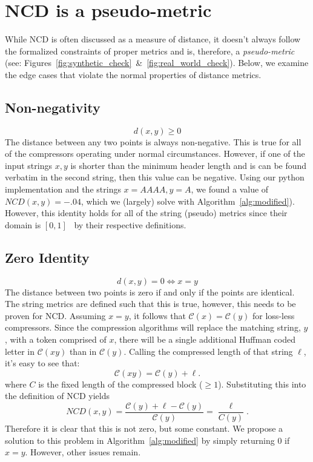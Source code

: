 \documentclass[conference]{IEEEtran}
\begin{document}
\section{NCD is a pseudo-metric}
\label{pseudometric}
While NCD is often discussed as a measure of distance, it doesn't always follow the formalized constraints of proper metrics and is, therefore, a \textit{pseudo-metric} (see: Figures~\ref{fig:synthetic_check}~\&~\ref{fig:real_world_check}). Below, we examine the edge cases that violate the normal properties of distance metrics.

\subsection{Non-negativity} 
$$
d(x, y) \geq 0
$$
The distance between any two points is always non-negative. This is true for all of the compressors operating under normal circumstances. However, if one of the input strings $x,y$ is shorter than the minimum header length and is can be found verbatim in the second string, then this value can be negative. Using our python implementation and the strings $x=AAAA, y=A$, we found a value of $NCD(x,y) = -.04$, which we (largely) solve with Algorithm~\ref{alg:modified}).
However, this identity holds for all of the string (pseudo) metrics since their domain is $[0,1]$~\cite{metrics,levenshtein} by their respective definitions. 


\subsection{Zero Identity} 
$$
d(x, y) = 0 \iff x = y
$$
The distance between two points is zero if and only if the points are identical. The string metrics are defined such that this is true, however, this needs to be proven for NCD.
Assuming $x = y$, it follows that $\mathcal{C}(x) = \mathcal{C}(y)$ for loss-less compressors.
Since the compression algorithms will replace the matching string, $y$, with a token comprised of $x$, there will be a single additional Huffman coded letter in $\mathcal{C}(xy)$ than in $\mathcal{C}(y)$. Calling the compressed length of that  string $\ell$, it's easy to see that:
$$
\mathcal{C}(xy) = \mathcal{C}(y) + \ell.
$$
where $C$ is the fixed length of the compressed block ($\geq 1$).
Substituting this into the definition of NCD yields
$$
NCD(x,y) = \frac{\mathcal{C}(y) + \ell - \mathcal{C}(y)}{\mathcal{C}(y)} = \frac{\ell}{C(y)}.
$$
Therefore it is clear that this is not zero, but some constant. 
We propose a solution to this problem in Algorithm~\ref{alg:modified} by simply returning 0 if $x=y$. However, other issues remain. 
\end{document}
